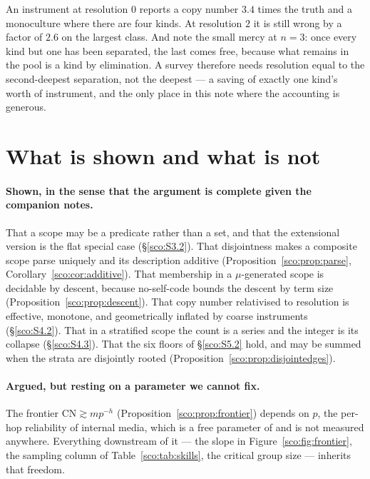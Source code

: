 \documentclass[11pt]{article}
\theoremstyle{plain}
\theoremstyle{definition}
\theoremstyle{remark}
\newcommand{\CN}{\mathrm{CN}}
\begin{document}
An instrument at resolution $0$ reports a copy number $3.4$ times the
truth and a monoculture where there are four kinds. At resolution $2$ it
is still wrong by a factor of $2.6$ on the largest class. And note the
small mercy at $n=3$: once every kind but one has been separated, the last
comes free, because what remains in the pool is a kind by elimination. A
survey therefore needs resolution equal to the second-deepest separation,
not the deepest --- a saving of exactly one kind's worth of instrument,
and the only place in this note where the accounting is generous.

\section{What is shown and what is not}\label{sco:S8}

\paragraph{Shown, in the sense that the argument is complete given the
companion notes.}
That a scope may be a predicate rather than a set, and that the
extensional version is the flat special case
(\S\ref{sco:S3.2}). That disjointness makes a composite scope parse
uniquely and its description additive
(Proposition~\ref{sco:prop:parse}, Corollary~\ref{sco:cor:additive}).
That membership in a $\mu$-generated scope is decidable by descent,
because no-self-code bounds the descent by term size
(Proposition~\ref{sco:prop:descent}). That copy number relativised to
resolution is effective, monotone, and geometrically inflated by coarse
instruments (\S\ref{sco:S4.2}). That in a stratified scope the count is a
series and the integer is its collapse (\S\ref{sco:S4.3}). That the six
floors of \S\ref{sco:S5.2} hold, and may be summed when the strata are
disjointly rooted (Proposition~\ref{sco:prop:disjointedges}).

\paragraph{Argued, but resting on a parameter we cannot fix.}
The frontier $\CN \gtrsim m p^{-h}$ (Proposition~\ref{sco:prop:frontier})
depends on $p$, the per-hop reliability of internal media, which is a free
parameter of \cite{engine} and is not measured anywhere. Everything
downstream of it --- the slope in Figure~\ref{sco:fig:frontier}, the
sampling column of Table~\ref{sco:tab:skills}, the critical group size ---
inherits that freedom.
\end{document}
